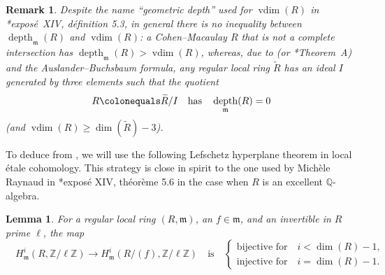 \documentclass[11pt, reqno]{amsart}
\newcommand{\bQ}{\mathbb{Q}}
\newcommand{\bZ}{\mathbb{Z}}
\newcommand{\fm}{\mathfrak{m}}
\DeclareMathOperator{\depth}{depth}	%
\DeclareMathOperator{\vdim}{vdim}		%
\newcommand{\ce}{\colonequals}
\newcommand{\ra}{\rightarrow}
\newcommand{\wt}{\widetilde}
\newcommand{\blem}{\begin{lemma}}
\newcommand{\elem}{\end{lemma}}
\newcommand{\x}{\text}
\providecommand{\qxq}[1]{\quad\text{#1}\quad}
\newcommand{\q}{\quad}
\newcommand{\brem}{\begin{rem}}
\newcommand{\erem}{\end{rem}}
\numberwithin{equation}{numberingbase}
\theoremstyle{thms}
\newtheorem{lemma}[numberingbase]{Lemma}
\theoremstyle{claims}
\theoremstyle{defs}
\newtheorem{rem}[numberingbase]{Remark}
\theoremstyle{thms}
\theoremstyle{defs}
\theoremstyle{subsection-tweak}
\theoremstyle{subsection-tweak}
\begin{document}
\brem
Despite the name ``geometric depth'' used for $\vdim(R)$ in \cite{SGA2new}*{expos\'{e}~XIV, d\'{e}finition 5.3}, in general there is no inequality between $\depth_\fm(R)$ and $\vdim(R)$: a Cohen--Macaulay $R$ that is not a complete intersection has $\depth_\fm(R) > \vdim(R) $, whereas, due to \cite{Bur68} (or \cite{Koh72}*{Theorem~A}) and the Auslander--Buchsbaum formula, any regular local ring $\wt{R}$ has an ideal $I$ generated by three elements such that the quotient 
\[
R \ce \wt{R}/I \qxq{has} \depth_\fm(R) = 0
\]
(and $\vdim(R) \ge \dim(\wt{R}) - 3$). %
\erem




To deduce  from , we will use the following Lefschetz hyperplane theorem in local \'{e}tale cohomology. This strategy is close in spirit to the one used by Mich\`{e}le Raynaud in \cite{SGA2new}*{expos\'{e} XIV, th\'{e}or\`{e}me 5.6} in the case when $R$ is an excellent $\bQ$-algebra. %







\blem \label{lem:local-hyperplane}
For a regular local ring $(R, \fm)$, an $f \in \fm$, and an invertible in $R$ prime $\ell$, the map
\[
\q H^i_\fm(R, \bZ/\ell\bZ) \ra H^i_\fm(R/(f), \bZ/\ell\bZ) \qxq{is} \begin{cases} \x{bijective for} \q i < \dim(R) - 1, \\ \x{injective for} \q i = \dim(R) - 1. \end{cases}
\]
\elem
\end{document}
